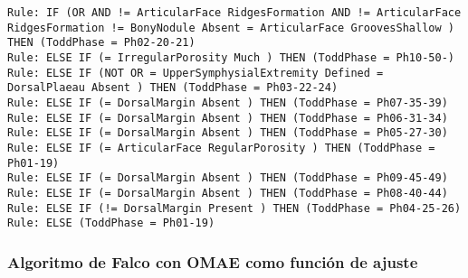 \begin{lstlisting}
Rule: IF (OR AND != ArticularFace RidgesFormation AND != ArticularFace RidgesFormation != BonyNodule Absent = ArticularFace GroovesShallow ) THEN (ToddPhase = Ph02-20-21)
Rule: ELSE IF (= IrregularPorosity Much ) THEN (ToddPhase = Ph10-50-)
Rule: ELSE IF (NOT OR = UpperSymphysialExtremity Defined = DorsalPlaeau Absent ) THEN (ToddPhase = Ph03-22-24)
Rule: ELSE IF (= DorsalMargin Absent ) THEN (ToddPhase = Ph07-35-39)
Rule: ELSE IF (= DorsalMargin Absent ) THEN (ToddPhase = Ph06-31-34)
Rule: ELSE IF (= DorsalMargin Absent ) THEN (ToddPhase = Ph05-27-30)
Rule: ELSE IF (= ArticularFace RegularPorosity ) THEN (ToddPhase = Ph01-19)
Rule: ELSE IF (= DorsalMargin Absent ) THEN (ToddPhase = Ph09-45-49)
Rule: ELSE IF (= DorsalMargin Absent ) THEN (ToddPhase = Ph08-40-44)
Rule: ELSE IF (!= DorsalMargin Present ) THEN (ToddPhase = Ph04-25-26)
Rule: ELSE (ToddPhase = Ph01-19)
\end{lstlisting}


\subsubsection{Algoritmo de Falco con OMAE como función de ajuste}

